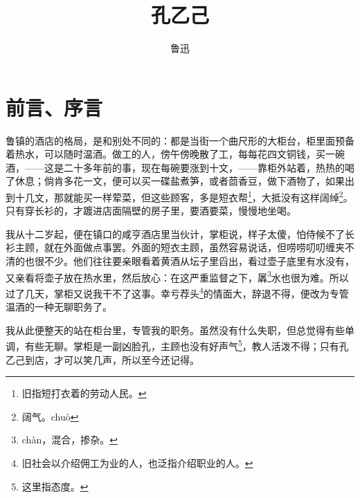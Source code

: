 \documentclass[12pt,UTF8]{ctexbook}
\title{\heiti\zihao{0} 孔乙己}
\author{鲁迅}
\date{}
\begin{document}
\maketitle
\tableofcontents

\frontmatter
\chapter{前言、序言}

\mainmatter

鲁镇的酒店的格局，是和别处不同的：都是当街一个曲尺形的大柜台，柜里面预备着热水，可以随时温酒。做工的人，傍午傍晚散了工，每每花四文铜钱，买一碗酒，——这是二十多年前的事，现在每碗要涨到十文，——靠柜外站着，热热的喝了休息；倘肯多花一文，便可以买一碟盐煮笋，或者茴香豆，做下酒物了，如果出到十几文，那就能买一样荤菜，但这些顾客，多是短衣帮\footnote{旧指短打衣着的劳动人民。}，大抵没有这样阔绰\footnote{阔气。chuò}。只有穿长衫的，才踱进店面隔壁的房子里，要酒要菜，慢慢地坐喝。

我从十二岁起，便在镇口的咸亨酒店里当伙计，掌柜说，样子太傻，怕侍候不了长衫主顾，就在外面做点事罢。外面的短衣主顾，虽然容易说话，但唠唠叨叨缠夹不清的也很不少。他们往往要亲眼看着黄酒从坛子里舀出，看过壶子底里有水没有，又亲看将壶子放在热水里，然后放心：在这严重监督之下，羼\footnote{chàn，混合，掺杂。}水也很为难。所以过了几天，掌柜又说我干不了这事。幸亏荐头\footnote{旧社会以介绍佣工为业的人，也泛指介绍职业的人。}的情面大，辞退不得，便改为专管温酒的一种无聊职务了。

我从此便整天的站在柜台里，专管我的职务。虽然没有什么失职，但总觉得有些单调，有些无聊。掌柜是一副凶脸孔，主顾也没有好声气\footnote{这里指态度。}，教人活泼不得；只有孔乙己到店，才可以笑几声，所以至今还记得。
\end{document}
